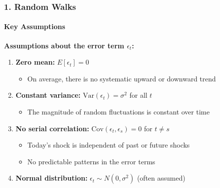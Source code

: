 \documentclass{beamer}
\begin{document}
\begin{foundframe}[t]
    \frametitle{1. Random Walks}
    \framesubtitle{Key Assumptions}

    \textbf{Assumptions about the error term $\epsilon_t$:}
    \vspace{1em}

    \begin{enumerate}
        \item \textbf{Zero mean:} $E[\epsilon_t] = 0$
        \begin{itemize}
            \item On average, there is no systematic upward or downward trend
        \end{itemize}
        \vspace{0.5em}

        \item \textbf{Constant variance:} $\text{Var}(\epsilon_t) = \sigma^2$ for all $t$
        \begin{itemize}
            \item The magnitude of random fluctuations is constant over time
        \end{itemize}
        \vspace{0.5em}

        \item \textbf{No serial correlation:} $\text{Cov}(\epsilon_t, \epsilon_s) = 0$ for $t \neq s$
        \begin{itemize}
            \item Today's shock is independent of past or future shocks
            \item No predictable patterns in the error terms
        \end{itemize}
        \vspace{0.5em}

        \item \textbf{Normal distribution:} $\epsilon_t \sim N(0, \sigma^2)$ (often assumed)
    \end{enumerate}

\end{foundframe}
\end{document}
